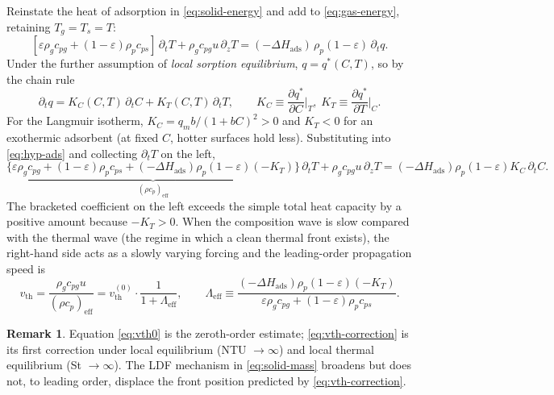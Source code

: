 \documentclass[a4paper,11pt]{amsart}
\theoremstyle{definition}
\newtheorem{remark}{Remark}
\begin{document}
Reinstate the heat of adsorption in \eqref{eq:solid-energy} and add to \eqref{eq:gas-energy}, retaining $T_g=T_s=T$:
\begin{equation}\label{eq:hyp-ads}
[\varepsilon\rho_g c_{pg}+(1-\varepsilon)\rho_p c_{ps}]\,\partial_t T+\rho_g c_{pg}u\,\partial_z T
=(-\Delta H_{\text{ads}})\,\rho_p(1-\varepsilon)\,\partial_t q.
\end{equation}
Under the further assumption of \emph{local sorption equilibrium}, $q=q^\ast(C,T)$, so by the chain rule
\[
\partial_t q = K_C(C,T)\,\partial_t C + K_T(C,T)\,\partial_t T,\qquad
K_C\!\equiv\!\frac{\partial q^\ast}{\partial C}\bigg|_T,\;
K_T\!\equiv\!\frac{\partial q^\ast}{\partial T}\bigg|_C.
\]
For the Langmuir isotherm, $K_C=q_m b/(1+bC)^2>0$ and $K_T<0$ for an exothermic adsorbent (at fixed $C$, hotter surfaces hold less). Substituting into \eqref{eq:hyp-ads} and collecting $\partial_t T$ on the left,
\begin{equation}\label{eq:effective}
\underbrace{\bigl\{\varepsilon\rho_g c_{pg}+(1-\varepsilon)\rho_p c_{ps}+(-\Delta H_{\text{ads}})\rho_p(1-\varepsilon)(-K_T)\bigr\}}_{\displaystyle (\rho c_p)_{\text{eff}}}\,\partial_t T+\rho_g c_{pg}u\,\partial_z T
=(-\Delta H_{\text{ads}})\rho_p(1-\varepsilon)K_C\,\partial_t C.
\end{equation}
The bracketed coefficient on the left exceeds the simple total heat capacity by a positive amount because $-K_T>0$. When the composition wave is slow compared with the thermal wave (the regime in which a clean thermal front exists), the right-hand side acts as a slowly varying forcing and the leading-order propagation speed is
\begin{equation}\label{eq:vth-correction}
v_{\mathrm{th}}=\frac{\rho_g c_{pg}u}{(\rho c_p)_{\text{eff}}}
= v_{\mathrm{th}}^{(0)}\cdot\frac{1}{1+\Lambda_{\text{eff}}},
\qquad
\Lambda_{\text{eff}}\equiv\frac{(-\Delta H_{\text{ads}})\rho_p(1-\varepsilon)(-K_T)}{\varepsilon\rho_g c_{pg}+(1-\varepsilon)\rho_p c_{ps}}.
\end{equation}

\begin{remark}
Equation \eqref{eq:vth0} is the zeroth-order estimate; \eqref{eq:vth-correction} is its first correction under local equilibrium (NTU $\to\infty$) and local thermal equilibrium (St $\to\infty$). The LDF mechanism in \eqref{eq:solid-mass} broadens but does not, to leading order, displace the front position predicted by \eqref{eq:vth-correction}.
\end{remark}
\end{document}
